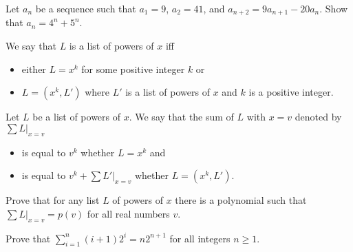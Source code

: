 \documentclass[addpoints]{exam}
\begin{document}
  \pagestyle{headandfoot}
  \runningheadrule

  \firstpagefooter{}{}{}
  \runningfooter{}{}{}
  \begin{flushright}

    \vspace{0.2in}
  \end{flushright}

  \begin{questions}
    \question[10]
      Let $a_n$ be a sequence such that $a_1 = 9$, $a_2 = 41$, and
			$a_{n + 2} = 9a_{n + 1} - 20a_n$. Show that $a_n = 4^n + 5^n$.

      \begin{solution}[\stretch{1}]
      \end{solution}
      \newpage
    \question
      We say that $L$ is a list of powers of $x$ iff
			\begin{itemize}
			  \item either $L = x^k$ for some positive integer $k$ or
			  \item $L = (x^k, L')$ where $L'$ is a list of powers of $x$ and
			    $k$ is a positive integer.
			\end{itemize}
			
			Let $L$ be a list of powers of $x$. We say that the sum of $L$
			with $x = v$ denoted by $\sum L\big\rvert_{x = v}$
			\begin{itemize}
			  \item is equal to $v^k$ whether $L = x^k$ and
			  \item is equal to $v^k + \sum L'\big\rvert_{x = v}$ whether
			    $L = (x^k, L')$.
			\end{itemize}
			
			Prove that for any list $L$ of powers of $x$ there is a polynomial such that
			$\sum L\big\rvert_{x = v} = p(v)$ for all real numbers $v$.

      \begin{solution}[\stretch{1}]
      \end{solution}
      \newpage
    \question[10]
      Prove that $\sum\limits_{i = 1}^n (i + 1) 2^i = n 2^{n + 1}$ for all integers
			$n \ge 1$.

      \begin{solution}[\stretch{1}]
      \end{solution}
      \newpage
  \end{questions}
\end{document}
